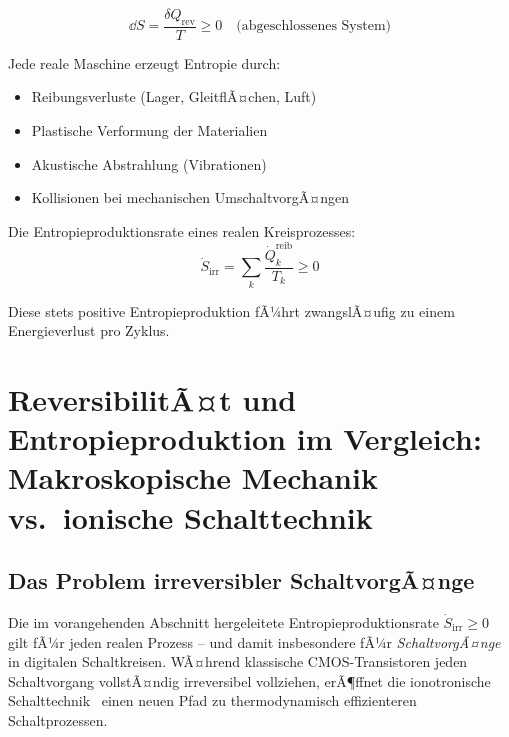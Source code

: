 ﻿\documentclass[12pt, a4paper]{report}
\theoremstyle{definition}
\theoremstyle{remark}
\begin{document}
\begin{equation}
  \dd S = \frac{\delta Q_{\text{rev}}}{T} \geq 0 \quad \text{(abgeschlossenes System)}
  \label{eq:entropie}
\end{equation}

Jede reale Maschine erzeugt Entropie durch:
\begin{itemize}
  \item Reibungsverluste (Lager, GleitflÃ¤chen, Luft)
  \item Plastische Verformung der Materialien
  \item Akustische Abstrahlung (Vibrationen)
  \item Kollisionen bei mechanischen UmschaltvorgÃ¤ngen
\end{itemize}

Die Entropieproduktionsrate eines realen Kreisprozesses:
\begin{equation}
  \dot{S}_{\text{irr}} = \sum_k \frac{\dot{Q}_k^{\text{reib}}}{T_k} \geq 0
  \label{eq:entropieprod}
\end{equation}

Diese stets positive Entropieproduktion fÃ¼hrt zwangslÃ¤ufig zu einem
Energieverlust pro Zyklus.

\section[ReversibilitÃ¤t und Entropieproduktion im Vergleich]{ReversibilitÃ¤t und Entropieproduktion im Vergleich:\\[2pt]
         Makroskopische Mechanik vs.\ ionische Schalttechnik}
\label{ssec:entropie_vergleich}

\subsection{Das Problem irreversibler SchaltvorgÃ¤nge}

Die im vorangehenden Abschnitt hergeleitete Entropieproduktionsrate
$\dot{S}_\text{irr} \geq 0$ gilt fÃ¼r jeden realen Prozess -- und damit
insbesondere fÃ¼r \emph{SchaltvorgÃ¤nge} in digitalen Schaltkreisen. WÃ¤hrend
klassische CMOS-Transistoren jeden Schaltvorgang vollstÃ¤ndig irreversibel
vollziehen, erÃ¶ffnet die ionotronische Schalttechnik~\cite{ionotronik2026}
einen neuen Pfad zu thermodynamisch effizienteren Schaltprozessen.
\end{document}
